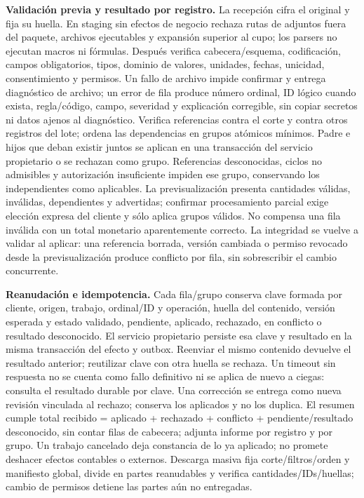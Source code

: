 \textbf{Validación previa y resultado por registro.} La recepción cifra el original y fija su huella. En staging sin efectos de negocio rechaza rutas de adjuntos fuera del paquete, archivos ejecutables y expansión superior al cupo; los parsers no ejecutan macros ni fórmulas. Después verifica cabecera/esquema, codificación, campos obligatorios, tipos, dominio de valores, unidades, fechas, unicidad, consentimiento y permisos. Un fallo de archivo impide confirmar y entrega diagnóstico de archivo; un error de fila produce número ordinal, ID lógico cuando exista, regla/código, campo, severidad y explicación corregible, sin copiar secretos ni datos ajenos al diagnóstico. Verifica referencias contra el corte y contra otros registros del lote; ordena las dependencias en grupos atómicos mínimos. Padre e hijos que deban existir juntos se aplican en una transacción del servicio propietario o se rechazan como grupo. Referencias desconocidas, ciclos no admisibles y autorización insuficiente impiden ese grupo, conservando los independientes como aplicables. La previsualización presenta cantidades válidas, inválidas, dependientes y advertidas; confirmar procesamiento parcial exige elección expresa del cliente y sólo aplica grupos válidos. No compensa una fila inválida con un total monetario aparentemente correcto. La integridad se vuelve a validar al aplicar: una referencia borrada, versión cambiada o permiso revocado desde la previsualización produce conflicto por fila, sin sobrescribir el cambio concurrente.

\textbf{Reanudación e idempotencia.} Cada fila/grupo conserva clave formada por cliente, origen, trabajo, ordinal/ID y operación, huella del contenido, versión esperada y estado validado, pendiente, aplicado, rechazado, en conflicto o resultado desconocido. El servicio propietario persiste esa clave y resultado en la misma transacción del efecto y outbox. Reenviar el mismo contenido devuelve el resultado anterior; reutilizar clave con otra huella se rechaza. Un timeout sin respuesta no se cuenta como fallo definitivo ni se aplica de nuevo a ciegas: consulta el resultado durable por clave. Una corrección se entrega como nueva revisión vinculada al rechazo; conserva los aplicados y no los duplica. El resumen cumple total recibido = aplicado + rechazado + conflicto + pendiente/resultado desconocido, sin contar filas de cabecera; adjunta informe por registro y por grupo. Un trabajo cancelado deja constancia de lo ya aplicado; no promete deshacer efectos contables o externos. Descarga masiva fija corte/filtros/orden y manifiesto global, divide en partes reanudables y verifica cantidades/IDs/huellas; cambio de permisos detiene las partes aún no entregadas.

